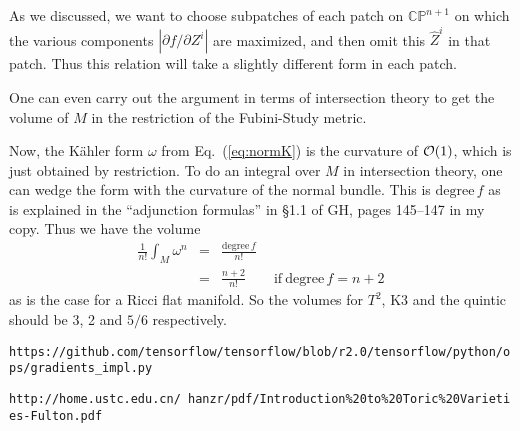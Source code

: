 \documentclass[12pt]{article}
\def\degree{\mbox{degree}\,}
\def\IC{\mathbb{C}}
\def\IP{\mathbb{P}}
\def\CN {{\cal N}}
\def\CO {{\cal O}}
\newcommand{\eq}[1]{Eq.~(\ref{eq:#1})}
\newcommand{\be}{\begin{equation}}
\newcommand{\ee}{\end{equation}}
\newcommand{\bea}{\begin{eqnarray}}
\newcommand{\eea}{\end{eqnarray}}
\begin{document}
As we discussed, we want to choose subpatches of each patch on $\IC\IP^{n+1}$ on which
the various components $|\partial f/\partial Z^i|$ are maximized, and then omit this $\hat Z^i$ in that patch.
Thus this relation will take a slightly different form in each patch.

One can even carry out the argument in terms of intersection theory to get the volume of $M$
in the restriction of the Fubini-Study metric.
\iffalse
This follows from the relation between the cotangent bundles on $\IC\IP^{n+1}$ and on $M$,
\be
0 \rightarrow T^*M \rightarrow  T^*{\IC\IP^{n+1} \rightarrow  \CN_{\IC\IP^{n+1}} M \rightarrow 0 .
\ee
This ``exact sequence''
 includes the fact we just used that locally $T^*{\IC\IP^{n+1}$ breaks up into the cotangent
and conormal bundles on $M$, but in fact makes sense on the whole manifold $M$.
It implies a relation between the Chern classes,
\be
c_1(T^*{\IC\IP^{n+1}) = c_1(T^*M) + c_1(\CN_{\IC\IP^{n+1}} M)
\ee
This can be compared with $f$ which
is also a section of the normal bundle.  
(this is explained in the ``adjunction formulas'' in \S 1.1 of GH, pages 145--147 in my copy), which tells us
that $c_1(\CN_{\IC\IP^{n+1}} M) = -\degree f$.  Then one can compute $c_1(T^*{\IC\IP^{n+1})$
to find that
\be
c_1(T^*M) = \mbox{degree} f - (n+2).
\ee
Thus we see the degree required to get $c_1(M)=0$ and a Calabi-Yau metric.
\fi
Now, the K\"ahler form $\omega$ from \eq{normK} is the curvature of $\CO(1)$, which is just
obtained by restriction.  To do an integral over $M$ in intersection theory, one can wedge the
form with the curvature of the normal bundle.  This is $\degree f$ as is 
explained in the ``adjunction formulas'' in \S 1.1 of GH, pages 145--147 in my copy.
Thus we have the volume
\bea
\frac{1}{n!}\int_M \omega^n &=& \frac{\degree f }{n!} \\
&=& \frac{n+2}{n!} \qquad \mbox{if} \ \degree f =n+2
\eea
as is the case for a Ricci flat manifold.  So the volumes for $T^2$, K3 and the quintic should be
3, 2 and $5/6$ respectively.


\begin{thebibliography}{10}

{\tt https://github.com/tensorflow/tensorflow/blob/r2.0/tensorflow/python/ops/gradients\_impl.py}

{\tt http://home.ustc.edu.cn/~hanzr/pdf/Introduction\%20to\%20Toric\%20Varieties-Fulton.pdf}

\end{thebibliography}
\end{document}
